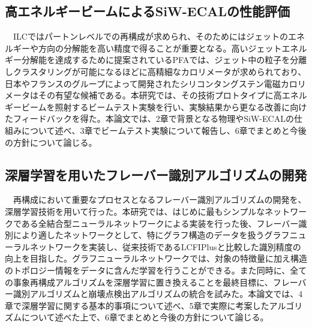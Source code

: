 \subsection{高エネルギービームによるSiW-ECALの性能評価}
　ILCではパートンレベルでの再構成が求められ、そのためにはジェットのエネルギーや方向の分解能を高い精度で得ることが重要となる。高いジェットエネルギー分解能を達成するために提案されているPFAでは、ジェット中の粒子を分離しクラスタリングが可能になるほどに高精細なカロリメータが求められており、日本やフランスのグループによって開発されたシリコンタングステン電磁カロリメータはその有望な候補である。本研究では、その技術プロトタイプに高エネルギービームを照射するビームテスト実験を行い、実験結果から更なる改善に向けたフィードバックを得た。本論文では、2章で背景となる物理やSiW-ECALの仕組みについて述べ、3章でビームテスト実験について報告し、6章でまとめと今後の方針について論じる。\\
\subsection{深層学習を用いたフレーバー識別アルゴリズムの開発}
　再構成において重要なプロセスとなるフレーバー識別アルゴリズムの開発を、深層学習技術を用いて行った。本研究では、はじめに最もシンプルなネットワークである全結合型ニューラルネットワークによる実装を行った後、フレーバー識別により適したネットワークとして、特にグラフ構造のデータを扱うグラフニューラルネットワークを実装し、従来技術であるLCFIPlusと比較した識別精度の向上を目指した。グラフニューラルネットワークでは、対象の特徴量に加え構造のトポロジー情報をデータに含んだ学習を行うことができる。また同時に、全ての事象再構成アルゴリズムを深層学習に置き換えることを最終目標に、フレーバー識別アルゴリズムと崩壊点検出アルゴリズムの統合を試みた。本論文では、4章で深層学習に関する基本的事項について述べ、5章で実際に考案したアルゴリズムについて述べた上で、6章でまとめと今後の方針について論じる。